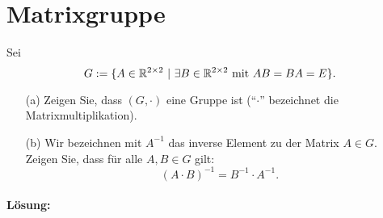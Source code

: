 \documentclass[
				a4paper,
				10pt
			]
			{scrartcl}
\begin{document}
\newpage
\section{Matrixgruppe}

Sei 
$$
	G := \{ A \in \mathbb{R}^{2\times 2}~|~ \exists B \in \mathbb{R}^{2\times 2} \text{ mit } AB=BA=E \}.
$$

\begin{itemize}
	\item[(a)] Zeigen Sie, dass $(G,\cdot)$ eine Gruppe ist (``$\cdot$'' bezeichnet die Matrixmultiplikation).
	\item[(b)] Wir bezeichnen mit $A^{-1}$ das inverse Element zu der Matrix $A \in G$.\\[1mm] 
			Zeigen Sie, dass f\"ur alle $A,B \in G$ gilt:
			$$
				(A\cdot B)^{-1} = B^{-1}\cdot A^{-1}.
			$$
\end{itemize}


\paragraph{L\"osung:}
\end{document}
